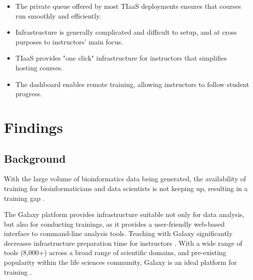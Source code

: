 \documentclass[a4paper,num-refs]{oup-contemporary}
\begin{document}
\begin{keypoints*}
\begin{itemize}
\item The private queue offered by most TIaaS deployments ensures that courses run smoothly and efficiently.
\item Infrastructure is generally complicated and difficult to setup, and at cross purposes to instructors' main focus.
\item TIaaS provides "one click" infrastructure for instructors that simplifies hosting courses.
\item The dashboard enables remote training, allowing instructors to follow student progress.
\end{itemize}
\end{keypoints*}

\section{Findings}
\subsection{Background}


With the large volume of bioinformatics data being generated, the availability of training for bioinformaticians and data scientists is not keeping up, resulting in a training gap \cite{Attwood2017}.

The Galaxy platform \cite{afgan2018galaxy} provides infrastructure suitable not only for data analysis, but also for conducting trainings, as it provides a user-friendly web-based interface to command-line analysis tools. Teaching with Galaxy significantly decreases infrastructure preparation time for instructors \cite{gtn2}. With a wide range of tools (8,000+) across a broad range of scientific domains, and pre-existing popularity within the life sciences community, Galaxy is an ideal platform for training \cite{gtn,gtn2}.
\end{document}
